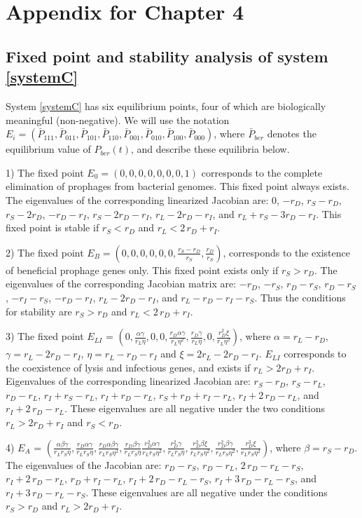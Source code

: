 \chapter{Appendix for Chapter 4}\label{AppD}
\section{Fixed point and stability analysis of system \ref{systemC}}
System \ref{systemC} has six equilibrium points, four of which are biologically meaningful (non-negative).  We will use the notation $E_i  = \left(\bar P_{111}, \bar P_{011}, \bar P_{101}, \bar P_{110}, \bar P_{001}, \bar P_{010}, \bar P_{100}, \bar P_{000}\right)$, where $\bar P_{ber}$ denotes the equilibrium value of $P_{ber}(t)$, and  describe these equilibria below.

1) The fixed point $E_0 = \left(0, 0, 0, 0, 0, 0, 0, 1\right)$ corresponds to the complete elimination of prophages from bacterial genomes. This fixed point always exists. The eigenvalues of the corresponding linearized Jacobian are: $0$,   $-r_D$, $r_S - r_D$, $r_S - 2 r_D$,  $-r_D - r_I$, $r_S - 2 r_D -r_I$, $r_L - 2 r_D - r_I$, and $r_L + r_S - 3 r_D -r_I $. This fixed point is stable if $r_S < r_D$ and $r_L < 2\,r_D + r_I$.

2) The fixed point $E_B = (0, 0, 0, 0, 0, 0, \frac{r_S - r_D}{r_S}, \frac{r_D}{r_S})$, corresponds to the existence of beneficial prophage genes only. This fixed point exists only if $r_S > r_D.$ The eigenvalues of the corresponding Jacobian matrix are: $-r_D$, $-r_S$, $r_D - r_S$, 
$r_D - r_S$, $-r_I - r_S$, $-r_D- r_I$, $r_L - 2 r_D - r_I$, and $r_L - r_D - r_I - r_S $. Thus the conditions for stability are $r_S > r_D$ and $r_L < 2\,r_D + r_I$.

3) The fixed point $E_{LI}$ =  $\left(0, \frac{\alpha\gamma}{r_L\eta}, 0 , 0, \frac{r_D\alpha\gamma}{r_L\eta^2}, \frac{r_D\gamma}{r_L\eta}, 0, \frac{r_D^2\xi}{r_L\eta^2} \right)$, where $\alpha = r_L-r_D$, $\gamma = r_L - 2r_D - r_I$, $\eta = r_L - r_D - r_I$ and $\xi = 2r_L - 2r_D - r_I$. $E_{LI}$ corresponds to the coexistence of lysis and infectious genes, and exists if $r_L > 2r_D + r_I$. Eigenvalues of the corresponding linearized Jacobian are: $r_S-r_D$, $r_S-r_L$, 
$r_D-r_L$, $r_I+r_S-r_L$, $r_I+r_D-r_L$, $r_S+ r_D+r_I-r_L$, $r_I+2\,r_D-r_L$, and $r_I+2\,r_D-r_L$. These eigenvalues are all negative under the two conditions $r_L > 2r_D + r_I$ and $r_S<r_D$.

4) $E_A$ =  
    $\left(\frac{\alpha\beta\gamma}{r_Lr_S\eta}, \frac{r_D\alpha\gamma}{r_Lr_S\eta}, \frac{r_D\alpha\beta\gamma}{r_Lr_S\eta^2},
    \frac{r_D\beta\gamma}{r_Lr_S\eta}
    \frac{r_D^2\alpha\gamma}{r_Lr_S\eta^2}, 
    \frac{r_D^2\gamma}{r_Lr_S\eta},
    \frac{r_D^2\beta\xi}{r_Lr_S\eta^2},
    \frac{r_D^2\beta\gamma}{r_Lr_S\eta^2}, 
    \frac{r_D^3\xi}{r_Lr_S\eta^2}  \right)$,
    where $\beta = r_S - r_D$.
 The eigenvalues of the Jacobian are: $r_D-r_S$,
$r_D-r_L$, $2\,r_D-r_L-r_S$, $r_I+2\,r_D-r_L$, $r_D+r_I-r_L$, 
$r_I+2\,r_D-r_L-r_S$, $r_I+3\,r_D-r_L-r_S$, and $r_I+3\,r_D-r_L-r_S$. These eigenvalues are all negative under the conditions $r_S>r_D$ and $r_L>2r_D + r_I$.
% 
% 